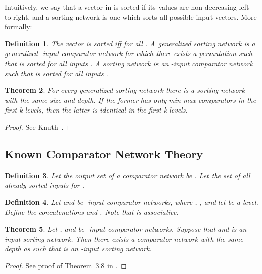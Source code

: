 \documentclass[13pt,a4paper]{article}
\newtheorem{theorem}{Theorem}[section]
\newtheorem{definition}[theorem]{Definition}
\begin{document}
Intuitively, we say that a vector in  is sorted if its values are non-decreasing left-to-right, and a sorting network is one which sorts all possible  input vectors. More formally:

\begin{definition}
\label{SortingNetworkDefinition}
The vector  is \emph{sorted} iff  for all .
A \emph{generalized sorting network} is a generalized -input comparator network for which there exists a permutation  such that  is sorted for all inputs .
A \emph{sorting network} is an -input comparator network such that  is sorted for all inputs .
\end{definition}

\begin{theorem}
\label{FloydKnuthGeneralizedTheorem}
For every generalized sorting network there is a sorting network with the same size and depth. If the former has only min-max comparators in the first k levels, then the latter is identical in the first k levels.
\end{theorem}

\begin{proof}
See Knuth~\cite{Knuth73}.
\end{proof}


\subsection{Known Comparator Network Theory}
\label{sec:background:theory:overlap}

\begin{definition}
\label{OutputSetDefinition}
Let the \emph{output set} of a comparator network  be . Let the set of all already sorted inputs     for .
\end{definition}

\begin{definition}
\label{ComparatorNetworkUnionLevelDefinition}
Let  and  be -input comparator networks, where , , and let  be a level. Define the concatenations  and . Note that  is associative.
\end{definition}

\begin{theorem}
\label{MinimalOutputSetTheorem}
Let ,  and  be -input comparator networks. Suppose that  and  is an -input sorting network. Then there exists a comparator network  with the same depth as  such that  is an -input sorting network.
\end{theorem}

\begin{proof}
See proof of Theorem~3.8 in \cite{Marinov:SortingNetworks:ThirdLevel}.
\end{proof}
\end{document}
